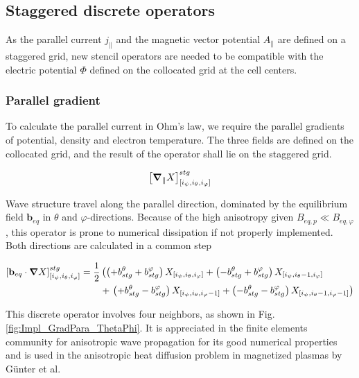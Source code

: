 \subsection{Staggered discrete operators}
As the parallel current $j_\parallel$ and the magnetic vector potential $A_\parallel$ are defined on a staggered grid, new stencil operators are needed to be compatible with the electric potential $\Phi$ defined on the collocated grid at the cell centers. 



\subsubsection{Parallel gradient}

To calculate the parallel current in Ohm's law, we require the parallel gradients of potential, density and electron temperature. The three fields are defined on the collocated grid, and the result of the operator shall lie on the staggered grid. 

\begin{equation}
	\left[\grad_{\parallel}X\right]^{stg}_{[i_\psi,i_\theta, i_\varphi]}
\end{equation}

Wave structure travel along the parallel direction, dominated by the equilibrium field $\mathbf{b}_{eq}$ in $\theta$ and $\varphi$-directions. Because of the high anisotropy given $B_{eq,p} \ll B_{eq,\varphi}$, this operator is prone to numerical dissipation if not properly implemented. Both directions are calculated in a common step

\begin{align}
	\left[\textbf{b}_{eq}\cdot\grad X \right]^{stg}_{[i_\psi,i_\theta, i_\varphi]} = \frac{1}{2}&\left(
	\left(+b^\theta_{stg} + b^\varphi_{stg}\right)X_{[i_\psi,i_\theta, i_\varphi]} + 
	\left(-b^\theta_{stg} + b^\varphi_{stg}\right)X_{[i_\psi,i_\theta-1, i_\varphi]} \right. \nonumber\\  &+ \left. 
	\left(+b^\theta_{stg} - b^\varphi_{stg}\right)X_{[i_\psi,i_\theta, i_\varphi-1]} + 
	\left(-b^\theta_{stg} - b^\varphi_{stg}\right)X_{[i_\psi,i_\theta-1, i_\varphi-1]}\right)
	\label{eq:Impl_GradParaStencil_FS}
\end{align}

This discrete operator involves four neighbors, as shown in Fig. \ref{fig:Impl_GradPara_ThetaPhi}. It is appreciated in the finite elements community for anisotropic wave propagation\cite{yee1966numerical,rubio2014finite, hasegawa2012staggered} for its good numerical properties and is used in the anisotropic heat diffusion problem in magnetized plasmas by Günter et al\cite{gunter2005}.


